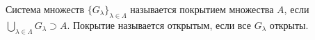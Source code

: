 
    Система множеств $\Big\{G_\lambda\Big\}_{\lambda\in\Lambda}$ называется покрытием множества $A$, если $\bigcup\limits_{\lambda\in\Lambda}G_\lambda\supset A$. Покрытие называется открытым, если все $G_\lambda$ открыты.
